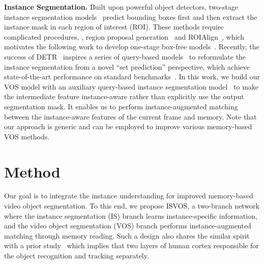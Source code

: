 \documentclass[10pt,twocolumn,letterpaper]{article}
\newcommand{\system}{ISVOS\xspace}
\begin{document}
\vspace{0.02in}
\noindent \textbf{Instance Segmentation.} Built upon powerful object detectors, two-stage instance segmentation models~\cite{he2017mask,li2017fully,liu2018path,huang2019mask,bolya2019yolact,chen2020blendmask} predict bounding boxes first and then extract the instance mask in each region of interest (ROI). These methods require complicated procedures, \eg, region proposal generation~\cite{ren2015faster} and ROIAlign~\cite{he2017mask}, which motivates the following work to develop one-stage box-free models~\cite{arnab2017pixelwise,newell2017associative,liu2017sgn,kong2018recurrent,gao2019ssap,neven2019instance,cheng2020panoptic,wang2020solo,wang2020solov2}. Recently, the success of DETR~\cite{carion2020end} inspires a series of query-based models~\cite{fang2021instances,cheng2021per,cheng2022masked} to reformulate the instance segmentation from a novel ``set prediction'' perspective, which achieve state-of-the-art performance on standard benchmarks~\cite{lin2014microsoft}. In this work, we build our VOS model with an auxiliary query-based instance segmentation model~\cite{cheng2022masked} to make the intermediate feature instance-aware rather than explicitly use the output segmentation mask. It enables us to perform instance-augmented matching between the instance-aware features of the current frame and memory. Note that our approach is generic and can be employed to improve various memory-based VOS methods.


\section{Method}
\label{sec:method}
Our goal is to integrate the instance understanding for improved memory-based video object segmentation. To this end, we propose \system, a two-branch network where the instance segmentation (IS) branch learns instance-specific information, and the video object segmentation (VOS) branch performs instance-augmented matching through memory reading. Such a design also shares the similar spirit with a prior study~\cite{goodale1992separate} which implies that two layers of human cortex responsible for the object recognition and tracking separately.
\end{document}
